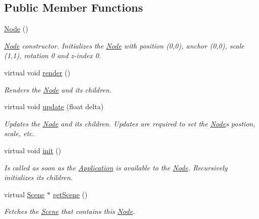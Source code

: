 \subsection*{Public Member Functions}
\begin{DoxyCompactItemize}
\item 
\mbox{\hyperlink{classsage_1_1Node_ad7a34779cad45d997bfd6d3d8043c75f}{Node}} ()
\begin{DoxyCompactList}\small\item\em \mbox{\hyperlink{classsage_1_1Node}{Node}} constructor. Initializes the \mbox{\hyperlink{classsage_1_1Node}{Node}} with position (0,0), anchor (0,0), scale (1,1), rotation 0 and z-\/index 0. \end{DoxyCompactList}\item 
virtual void \mbox{\hyperlink{classsage_1_1Node_ab93a6f41e02422a21c44227c0355382a}{render}} ()
\begin{DoxyCompactList}\small\item\em Renders the \mbox{\hyperlink{classsage_1_1Node}{Node}} and its children. \end{DoxyCompactList}\item 
virtual void \mbox{\hyperlink{classsage_1_1Node_a32878481ba54b3856ab53c10af13848e}{update}} (float delta)
\begin{DoxyCompactList}\small\item\em Updates the \mbox{\hyperlink{classsage_1_1Node}{Node}} and its children. Updates are required to set the \mbox{\hyperlink{classsage_1_1Node}{Node}}\textquotesingle{}s postion, scale, etc. \end{DoxyCompactList}\item 
virtual void \mbox{\hyperlink{classsage_1_1Node_ab87776adae83149e235e37ed469f4e10}{init}} ()
\begin{DoxyCompactList}\small\item\em Is called as soon as the \mbox{\hyperlink{classsage_1_1Application}{Application}} is available to the \mbox{\hyperlink{classsage_1_1Node}{Node}}. Recursively initializes its children. \end{DoxyCompactList}\item 
virtual \mbox{\hyperlink{classsage_1_1Scene}{Scene}} $\ast$ \mbox{\hyperlink{classsage_1_1Node_a22d0dfa466965da0324d47d22eb24e6b}{get\+Scene}} ()
\begin{DoxyCompactList}\small\item\em Fetches the \mbox{\hyperlink{classsage_1_1Scene}{Scene}} that contains this \mbox{\hyperlink{classsage_1_1Node}{Node}}. \end{DoxyCompactList}\item 

\end{DoxyCompactItemize}
